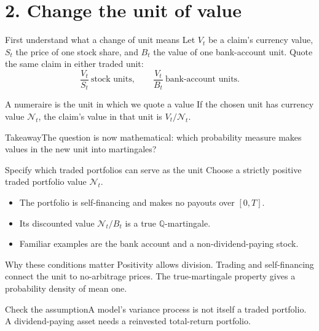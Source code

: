\documentclass[handout,10pt,t,aspectratio=169]{beamer}
\newenvironment{keybox}{\begin{exampleblock}{Takeaway}}{\end{exampleblock}}
\newenvironment{watchbox}{\begin{alertblock}{Check the assumption}}{\end{alertblock}}
\newcommand{\Q}{\mathbb Q}
\begin{document}
\section{2. Change the unit of value}

\begin{frame}{First understand what a change of unit means}
Let \(V_t\) be a claim's currency value, \(S_t\) the price of one stock share,
and \(B_t\) the value of one bank-account unit.
Quote the same claim in either traded unit:
\[
 \frac{V_t}{S_t}\ \text{stock units},\qquad
 \frac{V_t}{B_t}\ \text{bank-account units}.
\]
\begin{block}{A numeraire is the unit in which we quote a value}
If the chosen unit has currency value \(\mathcal N_t\), the claim's value
in that unit is \(V_t/\mathcal N_t\).
\end{block}
\begin{keybox}The question is now mathematical: which probability measure
makes values in the new unit into martingales?\end{keybox}
\end{frame}

\begin{frame}{Specify which traded portfolios can serve as the unit}
Choose a strictly positive traded portfolio value \(\mathcal N_t\).
\begin{itemize}
\item The portfolio is self-financing and makes no payouts over \([0,T]\).
\item Its discounted value \(\mathcal N_t/B_t\) is a true \(\Q\)-martingale.
\item Familiar examples are the bank account and a non-dividend-paying stock.
\end{itemize}
\begin{block}{Why these conditions matter}
Positivity allows division. Trading and self-financing connect the unit
to no-arbitrage prices. The true-martingale property gives a probability density of mean one.
\end{block}
\begin{watchbox}A model's variance process is not itself a traded portfolio.
A dividend-paying asset needs a reinvested total-return portfolio.\end{watchbox}
\end{frame}
\end{document}
